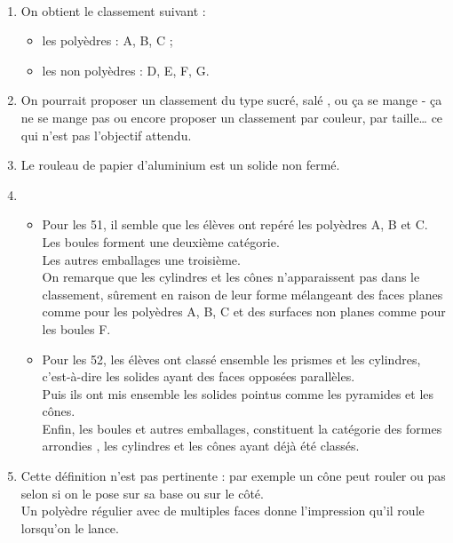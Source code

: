    \ \\ [-5mm]
   \begin{enumerate}
      \item On obtient le classement suivant :
      \begin{itemize}
         \item \blue les polyèdres : A, B, C ;
         \item \blue les non polyèdres : D, E, F, G.
      \end{itemize}
      \item On pourrait proposer un classement du type \og sucré, salé \fg{}, ou \og ça se mange - ça ne se mange pas \fg{} ou encore proposer un classement par couleur, par taille\dots{} ce qui n'est pas l'objectif attendu.
      \item Le rouleau de papier d'aluminium est un {\blue solide non fermé}.
      \item
      \begin{itemize}
         \item Pour les 51, il semble que les élèves ont \og repéré \fg{} les polyèdres A, B et C. \\
           Les boules forment une deuxième catégorie. \\
           Les autres emballages une troisième. \\
           On remarque que les cylindres et les cônes n'apparaissent pas dans le classement, sûrement en raison de leur forme mélangeant des faces planes comme pour les polyèdres A, B, C et des surfaces non planes comme pour les boules F.
         \item Pour les 52, les élèves ont classé ensemble les prismes et les cylindres, c'est-à-dire les solides ayant des faces opposées parallèles. \\
         Puis ils ont mis ensemble les solides \og pointus \fg{} comme les pyramides et les cônes. \\
         Enfin, les boules et autres emballages, constituent la catégorie des formes \og arrondies \fg{}, les cylindres et les cônes ayant déjà été classés.
      \end{itemize}
      \item Cette définition n'est pas pertinente : par exemple un cône peut rouler ou pas selon si on le pose sur sa base ou sur le côté. \\
      Un polyèdre régulier avec de multiples faces donne l'impression qu'il roule lorsqu'on le lance.
   \end{enumerate}
